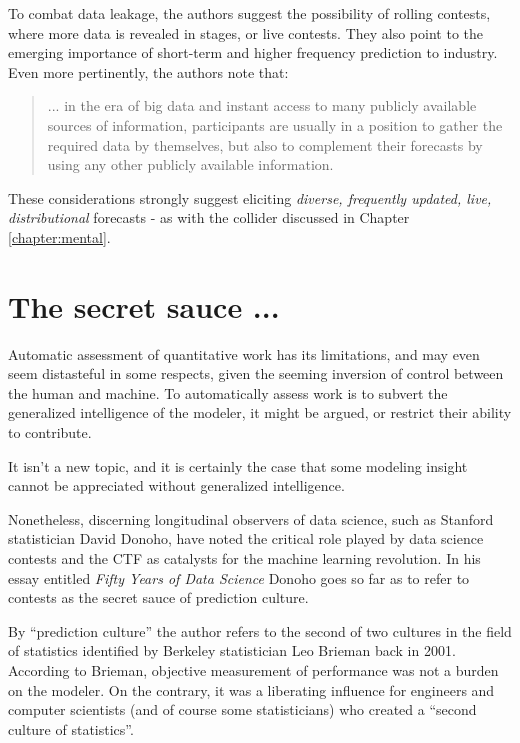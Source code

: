 To combat data leakage, the authors suggest the possibility of rolling contests, where more data is revealed in stages, or live contests. They also point to the emerging importance of short-term and higher frequency prediction to industry. Even more pertinently, the authors note that: 
\begin{quote}{\cite{Makridakis1979AccuracyInvestigation}}
   ... in the era of big data and instant access to many publicly available sources of information, participants are usually in a position to gather the required data by themselves, but also to complement their forecasts by using any other publicly available information.
\end{quote}
These considerations strongly suggest eliciting {\em diverse, frequently updated, live, distributional} forecasts - as with the collider discussed in Chapter \ref{chapter:mental}.   


\section{The secret sauce ...}

Automatic assessment of quantitative work has its limitations, and may even seem distasteful in some respects, given the seeming inversion of control between the human and machine. To automatically assess work is to subvert the generalized intelligence of the modeler, it might be argued, or restrict their ability to contribute. 

It isn't a new topic, and it is certainly the case that some modeling insight cannot be appreciated without generalized intelligence.  

Nonetheless, discerning longitudinal observers of data science, such as Stanford statistician David Donoho, have noted the critical role played by data science contests and the CTF as catalysts for the machine learning revolution. In his essay entitled {\em Fifty Years of Data Science} Donoho goes so far as to refer to contests as the secret sauce of prediction culture. 

By ``prediction culture'' the author refers to the second of two cultures in the field of statistics identified by Berkeley statistician Leo Brieman back in 2001. According to Brieman, objective measurement of performance was not a burden on the modeler. On the contrary, it was a liberating influence for engineers and computer scientists (and of course some statisticians) who created a ``second culture of statistics''. 

